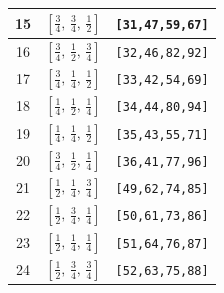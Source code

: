 \documentclass[fleqn,8pt]{jsarticle}
\begin{document}
\begin{longtable}{ccc}
15 & $\left[ \frac{3}{4},\, \frac{3}{4},\, \frac{1}{2} \right]$ & {\tt [31,47,59,67]} \\ \hline
16 & $\left[ \frac{3}{4},\, \frac{1}{2},\, \frac{3}{4} \right]$ & {\tt [32,46,82,92]} \\ \hline
17 & $\left[ \frac{3}{4},\, \frac{1}{4},\, \frac{1}{2} \right]$ & {\tt [33,42,54,69]} \\ \hline
18 & $\left[ \frac{1}{4},\, \frac{1}{2},\, \frac{1}{4} \right]$ & {\tt [34,44,80,94]} \\ \hline
19 & $\left[ \frac{1}{4},\, \frac{1}{4},\, \frac{1}{2} \right]$ & {\tt [35,43,55,71]} \\ \hline
20 & $\left[ \frac{3}{4},\, \frac{1}{2},\, \frac{1}{4} \right]$ & {\tt [36,41,77,96]} \\ \hline
21 & $\left[ \frac{1}{2},\, \frac{1}{4},\, \frac{3}{4} \right]$ & {\tt [49,62,74,85]} \\ \hline
22 & $\left[ \frac{1}{2},\, \frac{3}{4},\, \frac{1}{4} \right]$ & {\tt [50,61,73,86]} \\ \hline
23 & $\left[ \frac{1}{2},\, \frac{1}{4},\, \frac{1}{4} \right]$ & {\tt [51,64,76,87]} \\ \hline
24 & $\left[ \frac{1}{2},\, \frac{3}{4},\, \frac{3}{4} \right]$ & {\tt [52,63,75,88]} \\
\end{longtable}
\renewcommand{\arraystretch}{1.2}
\end{document}
